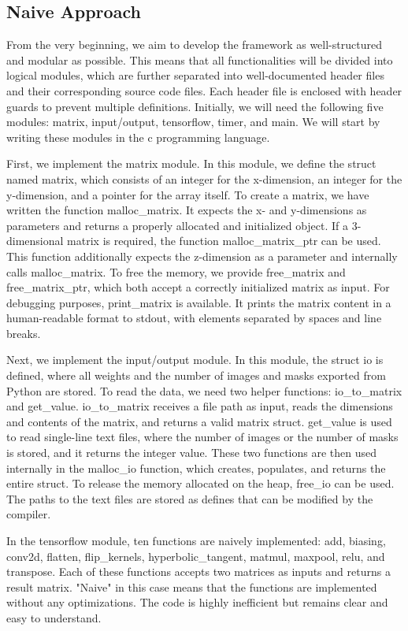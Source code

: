 \documentclass[modern,longauthor]{aastex7}
\begin{document}
\subsection{Naive Approach}
From the very beginning, we aim to develop the framework as well-structured and modular as possible. This means that all functionalities will be divided into logical modules, which are further separated into well-documented header files and their corresponding source code files. Each header file is enclosed with header guards to prevent multiple definitions. Initially, we will need the following five modules: matrix, input/output, tensorflow, timer, and main. We will start by writing these modules in the c programming language.

First, we implement the matrix module. In this module, we define the struct named matrix, which consists of an integer for the x-dimension, an integer for the y-dimension, and a pointer for the array itself. To create a matrix, we have written the function malloc\_matrix. It expects the x- and y-dimensions as parameters and returns a properly allocated and initialized object. If a 3-dimensional matrix is required, the function malloc\_matrix\_ptr can be used. This function additionally expects the z-dimension as a parameter and internally calls malloc\_matrix. To free the memory, we provide free\_matrix and free\_matrix\_ptr, which both accept a correctly initialized matrix as input. For debugging purposes, print\_matrix is available. It prints the matrix content in a human-readable format to stdout, with elements separated by spaces and line breaks.

Next, we implement the input/output module. In this module, the struct io is defined, where all weights and the number of images and masks exported from Python are stored. To read the data, we need two helper functions: io\_to\_matrix and get\_value. io\_to\_matrix receives a file path as input, reads the dimensions and contents of the matrix, and returns a valid matrix struct. get\_value is used to read single-line text files, where the number of images or the number of masks is stored, and it returns the integer value. These two functions are then used internally in the malloc\_io function, which creates, populates, and returns the entire struct. To release the memory allocated on the heap, free\_io can be used. The paths to the text files are stored as defines that can be modified by the compiler.

In the tensorflow module, ten functions are naively implemented: add, biasing, conv2d, flatten, flip\_kernels, hyperbolic\_tangent, matmul, maxpool, relu, and transpose. Each of these functions accepts two matrices as inputs and returns a result matrix. "Naive" in this case means that the functions are implemented without any optimizations. The code is highly inefficient but remains clear and easy to understand.
\end{document}
